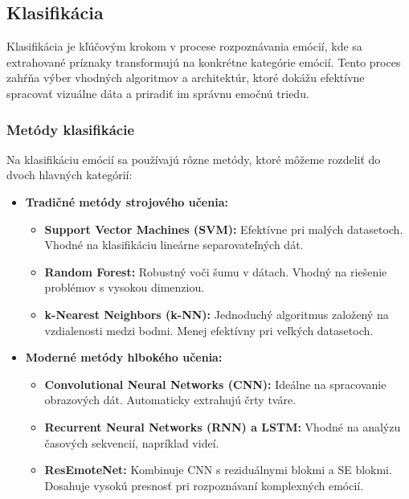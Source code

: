 \subsection{Klasifikácia}

Klasifikácia je kľúčovým krokom v procese rozpoznávania emócií, kde sa extrahované príznaky transformujú na konkrétne kategórie emócií. Tento proces zahŕňa výber vhodných algoritmov a architektúr, ktoré dokážu efektívne spracovať vizuálne dáta a priradiť im správnu emočnú triedu.

\subsubsection{Metódy klasifikácie}
Na klasifikáciu emócií sa používajú rôzne metódy, ktoré môžeme rozdeliť do dvoch hlavných kategórií:

\begin{itemize}
    \item \textbf{Tradičné metódy strojového učenia:}
    \begin{itemize}
        \item \textbf{Support Vector Machines (SVM):} 
        Efektívne pri malých datasetoch. Vhodné na klasifikáciu lineárne separovateľných dát.
        \item \textbf{Random Forest:} 
        Robustný voči šumu v dátach. Vhodný na riešenie problémov s vysokou dimenziou.
        \item \textbf{k-Nearest Neighbors (k-NN):} 
        Jednoduchý algoritmus založený na vzdialenosti medzi bodmi. Menej efektívny pri veľkých datasetoch.
    \end{itemize}
    
    \item \textbf{Moderné metódy hlbokého učenia:}
    \begin{itemize}
        \item \textbf{Convolutional Neural Networks (CNN):} 
        Ideálne na spracovanie obrazových dát. Automaticky extrahujú črty tváre.
        \item \textbf{Recurrent Neural Networks (RNN) a LSTM:} 
        Vhodné na analýzu časových sekvencií, napríklad videí.
        \item \textbf{ResEmoteNet:} 
        Kombinuje CNN s reziduálnymi blokmi a SE blokmi. Dosahuje vysokú presnosť pri rozpoznávaní komplexných emócií.
    \end{itemize}
\end{itemize}

